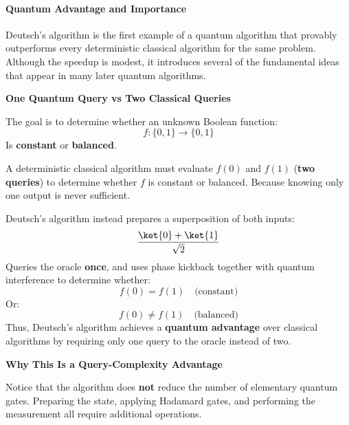 \paragraph{Quantum Advantage and Importance}\label{ex:quantum-advantage-and-importance}

Deutsch's algorithm is the first example of a quantum algorithm that provably outperforms every deterministic classical algorithm for the same problem. Although the speedup is modest, it introduces several of the fundamental ideas that appear in many later quantum algorithms.

\highspace
\begin{flushleft}
    \textcolor{Green3}{ \textbf{One Quantum Query vs Two Classical Queries}}
\end{flushleft}
The goal is to determine whether an unknown Boolean function:
\begin{equation*}
    f:\{0,1\}\to\{0,1\}
\end{equation*}
Is \textbf{constant} or \textbf{balanced}.

\highspace
\textcolor{Red2}{} A deterministic classical algorithm must evaluate $f(0)$ and $f(1)$ (\textbf{two queries}) to determine whether $f$ is constant or balanced. Because knowing only one output is never sufficient.

\highspace
\textcolor{Green3}{} Deutsch's algorithm instead prepares a superposition of both inputs:
\begin{equation*}
    \frac{\ket{0} + \ket{1}}{\sqrt{2}}
\end{equation*}
Queries the oracle \textbf{once}, and uses phase kickback together with quantum interference to determine whether:
\begin{equation*}
    f(0) = f(1) \quad \text{(constant)}
\end{equation*}
Or:
\begin{equation*}
    f(0) \neq f(1) \quad \text{(balanced)}
\end{equation*}
Thus, Deutsch's algorithm achieves a \textbf{quantum advantage} over classical algorithms by requiring only one query to the oracle instead of two.

\highspace
\begin{flushleft}
    \textcolor{Green3}{ \textbf{Why This Is a Query-Complexity Advantage}}
\end{flushleft}
Notice that the algorithm does \textbf{not} reduce the number of elementary quantum gates. Preparing the state, applying Hadamard gates, and performing the measurement all require additional operations.

